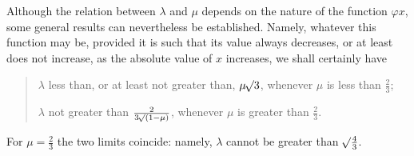 Although the relation between \(\lambda\) and \(\mu\) depends on the nature of the function \(\varphi x\), some general results can nevertheless be established. Namely, whatever this function may be, provided it is such that its value always decreases, or at least does not increase, as the absolute value of \(x\) increases, we shall certainly have
\begin{quote}
\(\lambda\) less than, or at least not greater than, \(\mu\mathord{{}^{}\!\surd}3\), whenever \(\mu\) is less than \(\tfrac23\);

\(\lambda\) not greater than \(\frac{2}{3\mathord{{}^{}\!\surd}(1-\mu)}\), whenever \(\mu\) is greater than \(\tfrac23\).
\end{quote}
For \(\mu=\tfrac23\) the two limits coincide: namely, \(\lambda\) cannot be greater than \(\mathord{{}^{}\!\surd}\tfrac43\).

